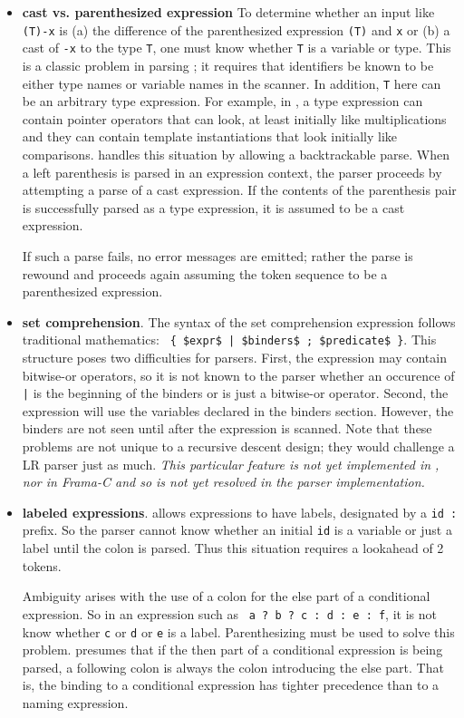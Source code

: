 \begin{itemize}
\item \textbf{cast vs. parenthesized expression} To determine whether an input like \lstinline|(T)-x| is (a) the difference of the parenthesized expression \lstinline|(T)| and \lstinline|x| or (b) a cast of \lstinline|-x| to the type \lstinline|T|, one must know whether \lstinline|T| is a variable or type. 
This is a classic problem in parsing \lang; it requires that identifiers be known to be either type names or variable names in the scanner. 
In addition, \lstinline|T| here can be an arbitrary type expression. 
For example, in \lang, a type expression can contain pointer operators that can look, at least initially like multiplications and they can contain template instantiations that look initially like comparisons. 
\fclang handles this situation by allowing a backtrackable parse. 
When a left parenthesis is parsed in an expression context, the parser proceeds by attempting a parse of a cast expression. If the contents of the parenthesis pair is successfully parsed as a type expression, it is assumed to be a cast expression. 

If such a parse fails, no error messages are emitted; rather the parse is rewound and proceeds again assuming the token sequence to be a parenthesized expression.

\item \textbf{set comprehension}. The syntax of the set comprehension expression follows traditional mathematics: \lstinline: { $expr$ | $binders$ ; $predicate$ }:. This structure poses two difficulties for parsers. First, the expression may contain bitwise-or operators, so it is not known to the parser whether an occurence of \verb:|: is the beginning of the binders or is just a bitwise-or operator. Second, the expression will use the variables declared in the binders section. However, the binders are not seen until after the expression is scanned. Note that these problems are not unique to a recursive descent design; they would challenge a LR parser just as much. \textit{This particular feature is not yet implemented in \fclang, nor in Frama-C and so is not yet resolved in the parser implementation.}

\item \textbf{labeled expressions}. \acslpp allows expressions to have labels, designated by a \lstinline|id : | prefix. 
So the parser cannot know whether an initial \lstinline|id| is a variable or just a label until the colon is parsed. 
Thus this situation requires a lookahead of 2 tokens.

Ambiguity arises with the use of a colon for the else part of a conditional expression. So in an expression such as 
\lstinline| a ? b ? c : d : e : f|, it is not know whether \lstinline|c| or \lstinline|d| or \lstinline|e| is a label. Parenthesizing must be used to solve this problem. \fcl presumes that if the then part of a conditional expression is being parsed, a following colon is always the colon introducing the else part. That is, the binding to a conditional expression has tighter precedence than to a naming expression.

\end{itemize}

